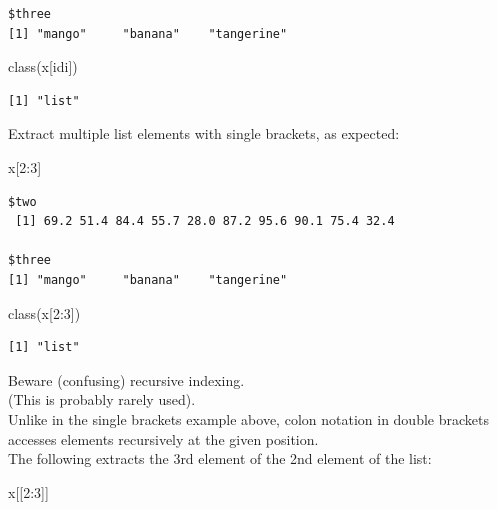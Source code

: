 \documentclass[
]{book}
\newenvironment{Shaded}{\begin{snugshade}}{\end{snugshade}}
\newcommand{\DecValTok}[1]{\textcolor[rgb]{0.00,0.00,0.81}{#1}}
\newcommand{\FunctionTok}[1]{\textcolor[rgb]{0.00,0.00,0.00}{#1}}
\newcommand{\NormalTok}[1]{#1}
\newcommand{\SpecialCharTok}[1]{\textcolor[rgb]{0.00,0.00,0.00}{#1}}
\begin{document}
\begin{verbatim}
$three
[1] "mango"     "banana"    "tangerine"
\end{verbatim}

\begin{Shaded}
\begin{Highlighting}[]
\FunctionTok{class}\NormalTok{(x[idi])}
\end{Highlighting}
\end{Shaded}

\begin{verbatim}
[1] "list"
\end{verbatim}

Extract multiple list elements with single brackets, as expected:

\begin{Shaded}
\begin{Highlighting}[]
\NormalTok{x[}\DecValTok{2}\SpecialCharTok{:}\DecValTok{3}\NormalTok{]}
\end{Highlighting}
\end{Shaded}

\begin{verbatim}
$two
 [1] 69.2 51.4 84.4 55.7 28.0 87.2 95.6 90.1 75.4 32.4

$three
[1] "mango"     "banana"    "tangerine"
\end{verbatim}

\begin{Shaded}
\begin{Highlighting}[]
\FunctionTok{class}\NormalTok{(x[}\DecValTok{2}\SpecialCharTok{:}\DecValTok{3}\NormalTok{])}
\end{Highlighting}
\end{Shaded}

\begin{verbatim}
[1] "list"
\end{verbatim}

Beware (confusing) recursive indexing.\\
(This is probably rarely used).\\
Unlike in the single brackets example above, colon notation in double brackets accesses elements recursively at the given position.\\
The following extracts the 3rd element of the 2nd element of the list:

\begin{Shaded}
\begin{Highlighting}[]
\NormalTok{x[[}\DecValTok{2}\SpecialCharTok{:}\DecValTok{3}\NormalTok{]]}
\end{Highlighting}
\end{Shaded}
\end{document}
